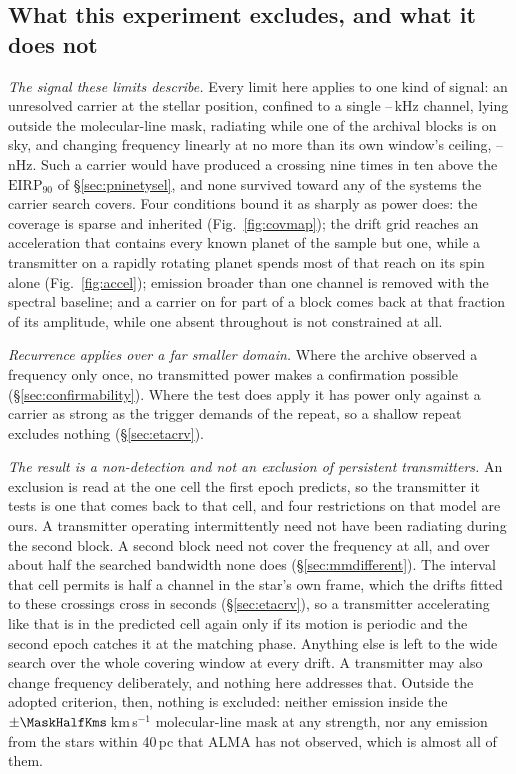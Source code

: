 \subsection{What this experiment excludes, and what it does not}
\label{sec:excludes}

\noindent\emph{The signal these limits describe.} Every limit here applies to
one kind of signal: an unresolved carrier at the stellar position, confined to
a single \ChanLoA--\ChanHiA\,kHz channel, lying outside the molecular-line
mask, radiating while one of the archival blocks is on sky, and changing
frequency linearly at no more than its own window's ceiling,
\DriftCeilLo--\DriftCeilHi\,nHz. Such a carrier would
have produced a crossing nine times in ten above the $\mathrm{EIRP}_{90}$ of
\S\ref{sec:pninetysel}, and none survived toward any of the \NSysClassA{}
systems the carrier search covers. Four conditions
bound it as sharply as power does: the coverage is sparse and
inherited (Fig.~\ref{fig:covmap}); the drift grid reaches an acceleration that contains every
known planet of the sample but one, while a transmitter on a rapidly rotating
planet spends most of that reach on its spin alone (Fig.~\ref{fig:accel}); emission broader than one channel is
removed with the spectral baseline; and a carrier on for part of a block comes
back at that fraction of its amplitude, while one absent throughout is not
constrained at all.

\noindent\emph{Recurrence applies over a far smaller domain.} Where the
archive observed a frequency only once, no transmitted power makes a
confirmation possible (\S\ref{sec:confirmability}). Where the test does apply
it has power only against a carrier as strong as the trigger demands of the
repeat, so a shallow repeat excludes nothing (\S\ref{sec:etacrv}).

\noindent\emph{The result is a non-detection and not an exclusion of
persistent transmitters.} An exclusion is read at the one cell the first
epoch predicts, so the transmitter it tests is one that comes back to that
cell, and four restrictions on that model are
ours. A transmitter operating intermittently need not have been radiating
during the second block. A second block need not cover the frequency at all,
and over about half the searched bandwidth none does
(\S\ref{sec:mmdifferent}). The interval that cell permits is half a channel in the star's own frame,
which the drifts fitted to these crossings cross in seconds
(\S\ref{sec:etacrv}), so a transmitter accelerating like that is in the
predicted cell again only if its motion is periodic and the second epoch
catches it at the matching phase. Anything else is left to the wide search
over the whole covering window at every drift. A transmitter may also change frequency deliberately,
and nothing here addresses that. Outside the adopted criterion, then, nothing
is excluded: neither emission inside the
$\pm\MaskHalfKms$\,km\,s$^{-1}$ molecular-line mask at any strength, nor any
emission from the \NGaiaCensus{} stars within 40\,pc that ALMA has not
observed, which is almost all of them.

